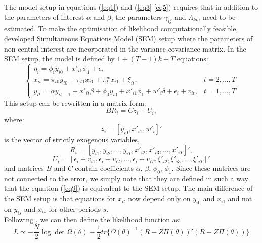\documentclass[a4paper]{article}
\begin{document}
\indent The model setup in equations (\ref{eq1}) and (\ref{eq3}-\ref{eq5}) requires that in addition to the parameters of interest $\alpha$ and $\beta$, the parameters $\gamma_{ij}$ and $\Lambda_{km}$ need to be estimated. To make the optimisation of likelihood computationally feasible, \citet{Moral+2013} developed Simultaneous Equations Model (SEM) setup where the parameters of non-central interest are incorporated in the variance-covariance matrix. In the SEM setup, the model is defined by $1 + (T - 1)k + T$ equations:
\[
\begin{cases}
    \eta_i = \phi_i y_{i0} + x'_{i1} \phi_1 + \epsilon_i &  \\
    x_{it} = \pi_{t0} y_{i0} + \pi_{t1} x_{i1} + \pi^w_t x_{i1} + \xi_{it}, & t = 2, ..., T \\
    y_{it} = \alpha y_{it-1} + x'_{it} \beta + \phi_0 y_{i0} + x'_{i1} \phi_1 + w'_i \delta + \epsilon_i + v_{it}, & t = 1, ..., T
\end{cases}
\]
This setup can be rewritten in a matrix form:
\begin{equation}\label{eq9}
    B R_i = C z_i + U_i,
\end{equation}
\noindent where:
\begin{equation}\label{eq10}
    z_i = [y_{i0}, x'_{i1}, w'_i]'
\end{equation}
is the vector of strictly exogenous variables,
\begin{equation}\label{eq11}
    R_i = [y_{i1}, y_{i2}, ..., y_{iT}, x'_{i2}, x'_{i3}, ..., x'_{iT}]',
\end{equation}
\begin{equation}\label{eq12}
    U_i = [\epsilon_i + v_{i1}, \epsilon_i + v_{i2}, ..., \epsilon_i + v_{iT}, \xi'_{i2}, \xi'_{i3}, ..., \xi'_{iT}]'
\end{equation}
\noindent and matrices $B$ and $C$ contain coefficients $\alpha$, $\beta$, $\phi_0$, $\phi_1$. Since these matrices are not connected to the error, we simply note that they are defined in such a way that the equation (\ref{eq9}) is equivalent to the SEM setup. The main difference of the SEM setup is that equations for $x_{it}$ now depend only on $y_{i0}$ and $x_{i1}$ and not on $y_{is}$ and $x_{is}$ for other periods $s$.\\
\indent Following \citet{Moral+2013}, we can then define the likelihood function as:
\begin{equation}\label{eq13}
    L \propto - \frac{N}{2} \log \det \Omega(\theta) - \frac{1}{2} tr \{ \Omega(\theta)^{-1} (R - Z \Pi(\theta))' (R - Z \Pi(\theta)) \}
\end{equation}
\end{document}
